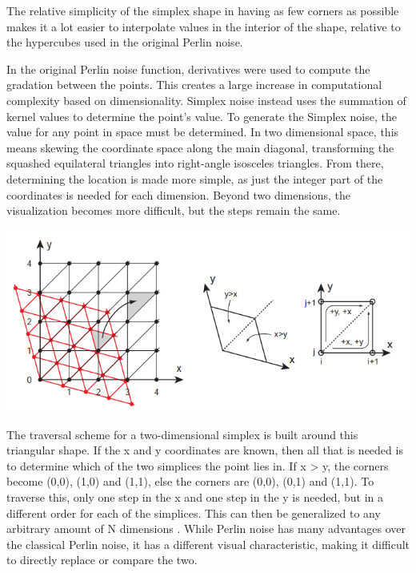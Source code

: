 \documentclass[10pt]{report}
\begin{document}
		The relative simplicity of the simplex shape in having as few corners as possible makes it a lot easier to interpolate values in the interior of the shape, relative to the hypercubes used in the original Perlin noise.
		
		In the original Perlin noise function, derivatives were used to compute the gradation between the points. This creates a large increase in computational complexity based on dimensionality. Simplex noise instead uses the summation of kernel values to determine the point's value. To generate the Simplex noise, the value for any point in space must be determined. In two dimensional space, this means skewing the coordinate space along the main diagonal, transforming the squashed equilateral triangles into right-angle isosceles triangles. From there, determining the location is made more simple, as just the integer part of the coordinates is needed for each dimension. Beyond two dimensions, the visualization becomes more difficult, but the steps remain the same.  
		
		\begin{minipage}{\textwidth}
			\centering
			\includegraphics[scale=.5]{skewed grid}
			\label{fig:fig9}
		\end{minipage}
		
		The traversal scheme for a two-dimensional simplex is built around this triangular shape. If the x and y coordinates are known, then all that is needed is to determine which of the two simplices the point lies in. If x > y, the corners become (0,0), (1,0) and (1,1), else the corners are (0,0), (0,1) and (1,1). To traverse this, only one step in the x and one step in the y is needed, but in a different order for each of the simplices. This can then be generalized to any arbitrary amount of N dimensions \cite{simplex-demyst}. While Perlin noise has many advantages over the classical Perlin noise, it has a different visual characteristic, making it difficult to directly replace or compare the two. 
		
\end{document}

